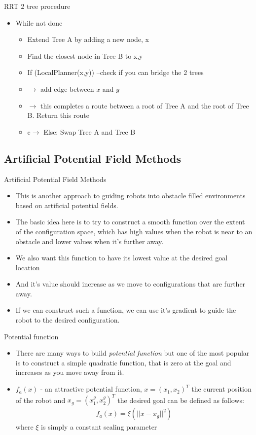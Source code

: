 \documentclass[10pt,mathserif]{beamer}
\begin{document}
\begin{frame}{RRT 2 tree procedure}
\begin{itemize}
\item While not done
\begin{itemize}
\item Extend Tree A by adding a new node, x
\item Find the closest node in Tree B to x,y
\item If (LocalPlanner(x,y)) --check if you can bridge the 2 trees
\item $\rightarrow$ add edge between $x$ and $y$
\item $\rightarrow$ this completes a route between a root of Tree A and the root of Tree B. Return this route
\item c$\rightarrow$ Else: Swap Tree A and Tree B
\end{itemize}
\end{itemize}
\end{frame}


\subsection{Artificial Potential Field Methods}
\begin{frame}{Artificial Potential Field Methods}
\begin{itemize}
\item This is another approach to guiding robots into obstacle filled environments 
based on artificial potential fields.
\item The basic idea here is to try to construct a smooth function over the extent of the 
configuration space, which has high values when the robot is near to an obstacle and lower values when
it's further away.
\item We also want this function to have its lowest value at the desired goal location
\item And it's value should increase as we move to configurations that are further away.
\item If we can construct such a function, we can use it's gradient to guide the robot to the desired
configuration.
\end{itemize}
\end{frame}

\begin{frame}{Potential function}
\begin{itemize}
\item There are many ways to build \textit{potential function} but one of the most popular is to 
construct a simple quadratic function, that is zero at the goal and increases as you move away from it.
\item $f_a(x)$ - an attractive potential function, $x = (x_1, x_2)^T$ the current position of the robot and $x_g = (x_1^g, x_2^g)^T$ the desired goal can be defined as follows:
\begin{align}
f_a(x) = \xi(||x - x_g||^2)
\end{align}
where $\xi$ is simply a constant scaling parameter
\end{itemize}
\end{frame}
\end{document}
